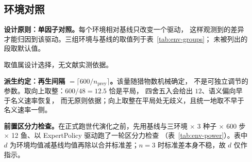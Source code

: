 \subsection{环境对照}\label{sec:exp-env-groups}

\textbf{设计原则：单因子对照。}每个环境相对基线只改变一个驱动，
这样观测到的差异才能归因到该驱动。三组环境与基线的取值列于表~\ref{tab:env-groups}；
未被列出的段取默认值。

\begin{table}[H]
  \centering
  \caption{环境对照三组与基线。}
  \label{tab:env-groups}
  \footnotesize
\setlength{\tabcolsep}{1pt}
  \begin{threeparttable}
  \begin{tablenotes}\footnotesize\raggedright
    \item 取值属设计选择，无文献实测依据。
  \end{tablenotes}
  \end{threeparttable}
\end{table}

\textbf{派生约定：再生间隔 $=\lceil 600/n_{\text{prey}}\rceil$。}该量随猎物数机械确定，
不是可独立调节的参数。取向上取整：$600/48=12.5$ 恰是平局，
四舍五入会给出 $12$、语义偏向早于名义速率恢复，
而无原则依据；向上取整在平局处无歧义，且统一地取不早于名义速率一侧。

\textbf{前置区分力检查。}在正式跑世代演化之前，先用基线与三环境
$\times$ 3 种子 $\times$ 600 步 $\times$ 12 鱼、以 ExpertPolicy 驱动跑了一轮区分力检查
（表~\ref{tab:env-power}）。表中 $d$ 为环境均值减基线均值再除以合并标准差；$n=3$ 时标准差本身不稳，故 $d$ 仅作指示。

